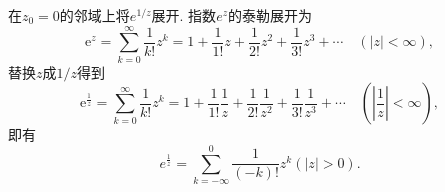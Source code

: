 \begin{examplebox}{在$z_0 = 0$的邻域上将$e^{1/z}$展开.}
指数$e^z$的泰勒展开为
\[
    \mathrm{e}^z=\sum_{k=0}^{\infty} \frac{1}{k !} z^k=1+\frac{1}{1 !} z+\frac{1}{2 !} z^2+\frac{1}{3 !} z^3+\cdots \quad(|z|<\infty),    
\]
替换$z$成$1/z$得到
\[
    \mathrm{e}^{\frac{1}{z}}=\sum_{k=0}^{\infty} \frac{1}{k !} z^k=1+\frac{1}{1 !} \frac{1}{z}+\frac{1}{2 !} \frac{1}{z^2}+\frac{1}{3 !} \frac{1}{z^3}+\cdots \quad(|\frac{1}{z}|<\infty),    
\]
即有
\[
e^{\frac{1}{z}} = \sum_{k=-\infty}^{0} \frac{1}{(-k)!} z^k ( |z| > 0) .
\]
\end{examplebox}